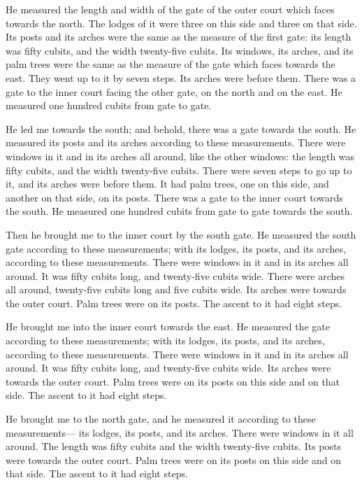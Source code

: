  He measured the length and width of the gate of the
outer court which faces towards the north.  The lodges of
it were three on this side and three on that side. Its posts and its
arches were the same as the measure of the first gate: its length was
fifty cubits, and the width twenty-five cubits.  Its
windows, its arches, and its palm trees were the same as the measure of
the gate which faces towards the east. They went up to it by seven
steps. Its arches were before them.  There was a gate to
the inner court facing the other gate, on the north and on the east. He
measured one hundred cubits from gate to gate.

 He led me towards the south; and behold, there was a
gate towards the south. He measured its posts and its arches according
to these measurements.  There were windows in it and in
its arches all around, like the other windows: the length was fifty
cubits, and the width twenty-five cubits.  There were
seven steps to go up to it, and its arches were before them. It had palm
trees, one on this side, and another on that side, on its posts.
 There was a gate to the inner court towards the south.
He measured one hundred cubits from gate to gate towards the south.

 Then he brought me to the inner court by the south gate.
He measured the south gate according to these measurements;
 with its lodges, its posts, and its arches, according to
these measurements. There were windows in it and in its arches all
around. It was fifty cubits long, and twenty-five cubits wide.
 There were arches all around, twenty-five cubits long
and five cubits wide.  Its arches were towards the outer
court. Palm trees were on its posts. The ascent to it had eight steps.

 He brought me into the inner court towards the east. He
measured the gate according to these measurements;  with
its lodges, its posts, and its arches, according to these measurements.
There were windows in it and in its arches all around. It was fifty
cubits long, and twenty-five cubits wide.  Its arches
were towards the outer court. Palm trees were on its posts on this side
and on that side. The ascent to it had eight steps.

 He brought me to the north gate, and he measured it
according to these measurements---  its lodges, its
posts, and its arches. There were windows in it all around. The length
was fifty cubits and the width twenty-five cubits.  Its
posts were towards the outer court. Palm trees were on its posts on this
side and on that side. The ascent to it had eight steps.

